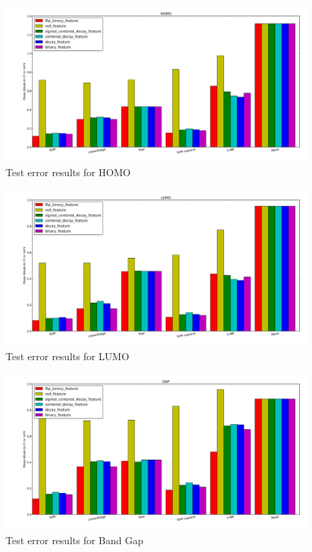 \documentclass[12pt, oneside]{article}   	%
\begin{document}
\begin{figure}
\begin{center}
\includegraphics [width=1\textwidth]{homo.png}
\caption{Test error results for HOMO}\label{fig1}
\end{center}
\end{figure}

\begin{figure}
\begin{center}
\includegraphics [width=1\textwidth]{lumo.png}
\caption{Test error results for LUMO}\label{fig2}
\end{center}
\end{figure}

\begin{figure}
\begin{center}
\includegraphics [width=1\textwidth]{gap.png}
\caption{Test error results for Band Gap}\label{fig3}
\end{center}
\end{figure}
\end{document}
